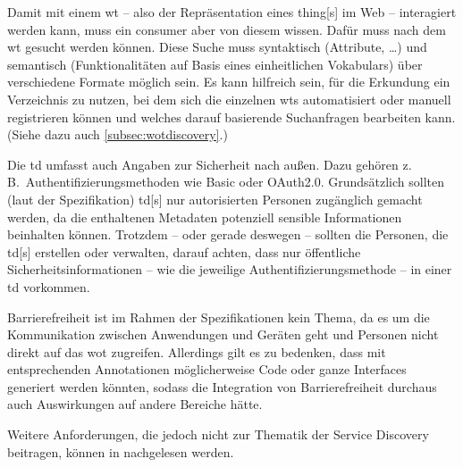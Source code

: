 
Damit mit einem \gls{wt} -- also der Repräsentation eines \gls{thing}[s] im Web -- interagiert werden kann, muss ein \gls{consumer} aber von diesem wissen. Dafür muss nach dem \gls{wt} gesucht werden können. Diese Suche muss syntaktisch (Attribute, …) und semantisch (Funktionalitäten auf Basis eines einheitlichen Vokabulars) über verschiedene Formate möglich sein. Es kann hilfreich sein, für die Erkundung ein Verzeichnis zu nutzen, bei dem sich die einzelnen \glspl{wt} automatisiert oder manuell registrieren können und welches darauf basierende Suchanfragen bearbeiten kann. (Siehe dazu auch \autoref{subsec:wotdiscovery}.)


Die \gls{td} umfasst auch Angaben zur Sicherheit nach außen. Dazu gehören z.\,B.\ Authentifizierungsmethoden wie Basic oder OAuth2.0. Grundsätzlich sollten (laut der Spezifikation) \gls{td}[s] nur autorisierten Personen zugänglich gemacht werden, da die enthaltenen Metadaten potenziell sensible Informationen beinhalten können. Trotzdem -- oder gerade deswegen -- sollten die Personen, die \gls{td}[s] erstellen oder verwalten, darauf achten, dass nur öffentliche Sicherheitsinformationen -- wie die jeweilige Authentifizierungsmethode -- in einer \gls{td} vorkommen.


Barrierefreiheit ist im Rahmen der Spezifikationen kein Thema, da es um die Kommunikation zwischen Anwendungen und Geräten geht und Personen nicht direkt auf das \gls{wot} zugreifen. Allerdings gilt es zu bedenken, dass mit entsprechenden Annotationen möglicherweise Code oder ganze Interfaces generiert werden könnten, sodass die Integration von Barrierefreiheit durchaus auch Auswirkungen auf andere Bereiche hätte.

Weitere Anforderungen, die jedoch nicht zur Thematik der Service Discovery beitragen, können in  \autocite{w3c.wot.architecture.20200408} nachgelesen werden.
